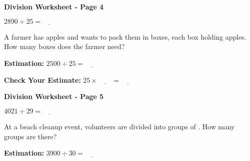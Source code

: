 \documentclass[letterpaper,12pt]{article} %
\begin{document}
\newpage



\Huge \textbf{Division Worksheet - Page 4}

\huge $ 2890 \div 25 = \underline{\hspace{2em}} $

\vspace{1em} %
\Large A farmer has \underline{\hspace{2em}} apples and wants to pack them in boxes, each box holding \underline{\hspace{2em}} apples. How many boxes does the farmer need?

\vspace{1em} %
\Large \textbf{Estimation:}
\huge $ 2500 \div 25 = \underline{\hspace{2em}} $

\vspace{1em} %
\Large \textbf{Check Your Estimate:}
\huge $ 25 \times \underline{\hspace{2em}} = \underline{\hspace{2em}} $

\vfill
{}


\newpage




\Huge \textbf{Division Worksheet - Page 5}

\huge $ 4021 \div 29 = \underline{\hspace{2em}} $

\vspace{1em} %
\Large At a beach cleanup event, \underline{\hspace{2em}} volunteers are divided into groups of \underline{\hspace{2em}}. How many groups are there?

\vspace{1em} %
\Large \textbf{Estimation:}
\huge $ 3900 \div 30 = \underline{\hspace{2em}} $
\end{document}
